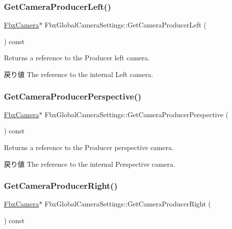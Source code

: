 \subsubsection{\texorpdfstring{Get\+Camera\+Producer\+Left()}{GetCameraProducerLeft()}}
{\footnotesize\ttfamily \hyperlink{class_fbx_camera}{Fbx\+Camera}$\ast$ Fbx\+Global\+Camera\+Settings\+::\+Get\+Camera\+Producer\+Left (\begin{DoxyParamCaption}{ }\end{DoxyParamCaption}) const}

Returns a reference to the Producer left camera. \begin{DoxyReturn}{戻り値}
The reference to the internal Left camera. 
\end{DoxyReturn}
\mbox{\label{class_fbx_global_camera_settings_a4353a05481d6dad14fbd6f3fdaf8541c}} 
\subsubsection{\texorpdfstring{Get\+Camera\+Producer\+Perspective()}{GetCameraProducerPerspective()}}
{\footnotesize\ttfamily \hyperlink{class_fbx_camera}{Fbx\+Camera}$\ast$ Fbx\+Global\+Camera\+Settings\+::\+Get\+Camera\+Producer\+Perspective (\begin{DoxyParamCaption}{ }\end{DoxyParamCaption}) const}

Returns a reference to the Producer perspective camera. \begin{DoxyReturn}{戻り値}
The reference to the internal Perspective camera. 
\end{DoxyReturn}
\mbox{\label{class_fbx_global_camera_settings_a0166b7f6aac53c8a9b3f6deabf77a09e}} 
\subsubsection{\texorpdfstring{Get\+Camera\+Producer\+Right()}{GetCameraProducerRight()}}
{\footnotesize\ttfamily \hyperlink{class_fbx_camera}{Fbx\+Camera}$\ast$ Fbx\+Global\+Camera\+Settings\+::\+Get\+Camera\+Producer\+Right (\begin{DoxyParamCaption}{ }\end{DoxyParamCaption}) const}

